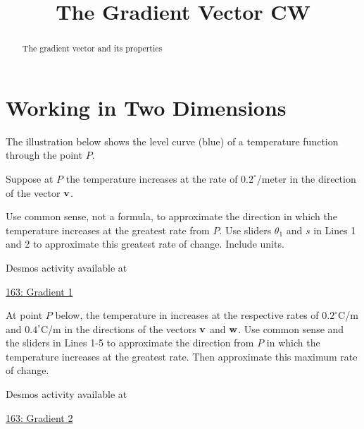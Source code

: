 \documentclass{ximera}
\title{The Gradient Vector CW}
\begin{document}
\begin{abstract}
The gradient vector and its properties
\end{abstract}
\maketitle

\section{Working in Two Dimensions}

\begin{question} \label{Q3f3r}
The illustration below shows the level curve (blue) of a temperature function through the point $P$. 

Suppose at $P$ the temperature increases at the rate of $0.2^\circ$/meter in the direction of the vector ${\bf v}$.

Use common sense, not a formula, to approximate the direction in which the temperature increases at the greatest rate from $P$. Use sliders $\theta_1$ and $s$ in Lines 1 and 2 to approximate this greatest rate of change. Include units.

\begin{onlineOnly}
    \begin{center}
\end{center}
\end{onlineOnly}

Desmos activity available at

\href{https://www.desmos.com/calculator/rasqej1ixl}{163: Gradient 1}
\end{question}



\begin{question} \label{Qpdf3r40}

At point $P$ below, the temperature in increases at the respective rates of $0.2^\circ$C/m and $0.4^\circ$C/m in the directions of the vectors ${\bf v}$ and ${\bf w}$. Use common sense and the sliders in Lines 1-5 to approximate the direction from $P$ in which the temperature increases at the greatest rate. Then approximate this maximum rate of change.

\begin{onlineOnly}
    \begin{center}
\end{center}
\end{onlineOnly}

Desmos activity available at

\href{https://www.desmos.com/calculator/4zibriggsa}{163: Gradient 2}


\end{question}
\end{document}
